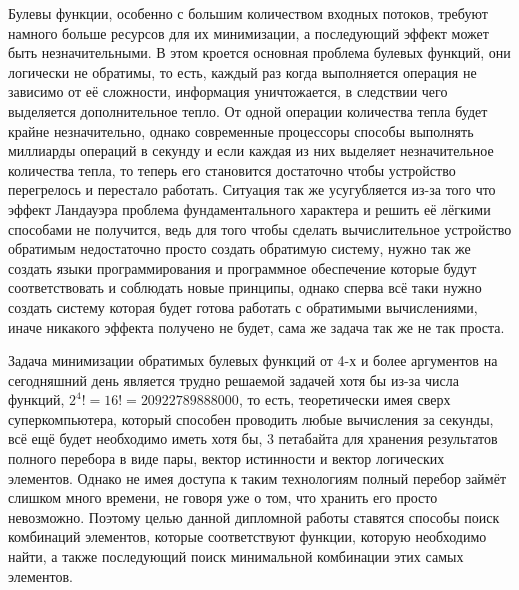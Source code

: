 \documentclass[14pt]{extarticle} %
\begin{document}




Булевы функции, особенно с большим количеством входных потоков, требуют намного больше ресурсов для их минимизации, а последующий эффект может быть незначительными. В этом кроется основная проблема булевых функций, они логически не обратимы, то есть, каждый раз когда выполняется операция не зависимо от её сложности, информация уничтожается, в следствии чего выделяется дополнительное тепло. От одной операции количества тепла будет крайне незначительно, однако современные процессоры способы выполнять миллиарды операций в секунду и если каждая из них выделяет незначительное количества тепла, то теперь его становится достаточно чтобы устройство перегрелось и перестало работать. Ситуация так же усугубляется из-за того что эффект Ландауэра проблема фундаментального характера и решить её лёгкими способами не получится, ведь для того чтобы сделать вычислительное устройство обратимым недостаточно просто создать обратимую систему, нужно так же создать языки программирования и программное обеспечение которые будут соответствовать и соблюдать новые принципы, однако сперва всё таки нужно создать систему которая будет готова работать с обратимыми вычислениями, иначе никакого эффекта получено не будет, сама же задача так же не так проста. 




Задача минимизации обратимых булевых функций от 4-х и более аргументов на сегодняшний день является трудно решаемой задачей хотя бы из-за числа функций, $2^{4}!=16!=20922789888000$, то есть, теоретически имея сверх суперкомпьютера, который способен проводить любые вычисления за секунды, всё ещё будет необходимо иметь хотя бы, 3 петабайта для хранения результатов полного перебора в виде пары, вектор истинности и вектор логических элементов. Однако не имея доступа к таким технологиям полный перебор займёт слишком много времени, не говоря уже о том, что хранить его просто невозможно. Поэтому целью данной дипломной работы ставятся способы поиск комбинаций элементов, которые соответствуют функции, которую необходимо найти, а также последующий поиск минимальной комбинации этих самых элементов.
\end{document}
